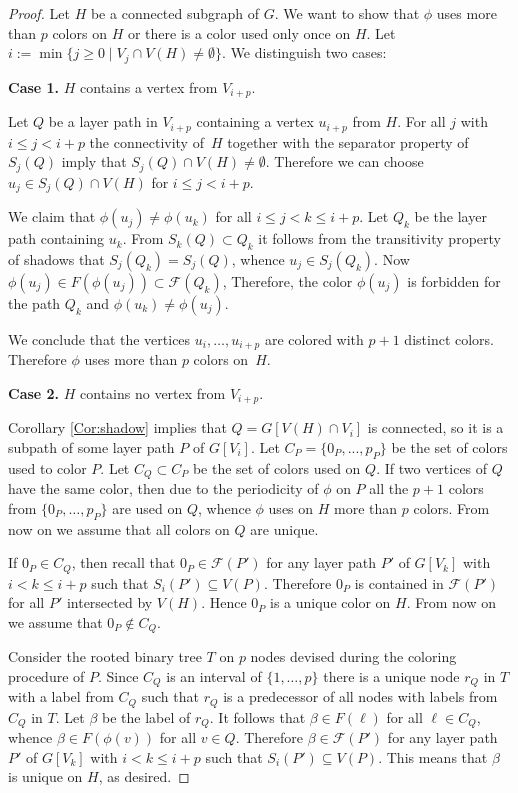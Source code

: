 \documentclass[11pt]{article}
\begin{document}
\begin{proof}
  Let $H$ be a connected subgraph of $G$. We want to show that $\phi$
  uses more than $p$ colors on $H$ or there is a color used only once
  on $H$. Let $i:=\min\{j\geq0\mid V_j\cap V(H)\neq \emptyset\}$.  We distinguish two
  cases: \medskip

\noindent\textbf{Case 1.}
$H$ contains a vertex from $V_{i+p}$.

Let $Q$ be a layer path in $V_{i+p}$ containing a vertex $u_{i+p}$
from $H$. For all $j$ with $i\leq j < i+p$ the connectivity of~$H$
together with the separator property of $S_j(Q)$ imply that
$S_j(Q) \cap V(H) \neq \emptyset$. Therefore we can choose
$u_j \in S_j(Q) \cap V(H)$ for $i\leq j < i+p$.

We claim that $\phi(u_j) \neq \phi(u_k)$ for all
$i\leq j < k \leq i+p$.  Let $Q_k$ be the layer path containing
$u_k$. From $S_k(Q) \subset Q_k$ it follows from the transitivity
property of shadows that $S_j(Q_k) = S_j(Q)$, whence $u_j \in S_j(Q_k)$. Now
$\phi(u_j) \in F(\phi(u_j)) \subset \mathcal{F}(Q_k)$,
Therefore, the color $\phi(u_j)$ is forbidden for the path $Q_k$ 
and $\phi(u_k)\neq\phi(u_j)$.
  
We conclude that the vertices $u_i,\ldots,u_{i+p}$ are colored with $p+1$ 
distinct colors. Therefore $\phi$ uses more than $p$ colors on~$H$.
\medskip
  
  \noindent\textbf{Case 2.}
  $H$ contains no vertex from $V_{i+p}$.
		
  Corollary \ref{Cor:shadow} implies that $Q=G[V(H)\cap V_i]$ is connected, so
  it is a subpath of some layer path $P$ of $G[V_i]$. Let $C_P=\{0_P,...,p_P\}$ be the set of colors
  used to color $P$.
  Let $C_Q\subset C_P$ be the set of colors used on $Q$.
  If two vertices of $Q$ have the same color, then due to the periodicity
  of $\phi$ on $P$ all the $p+1$ colors from $\{0_P,\ldots,p_P\}$ are used on $Q$, whence
  $\phi$ uses on $H$
  more than $p$ colors. From now on we assume that all colors on $Q$
  are unique.
  
  If $0_P \in C_Q$, then recall that $0_P \in \mathcal{F}(P')$ for any layer path
  $P'$ of $G[V_k]$ with $i<k\leq i+p$ such that $S_i(P') \subseteq V(P)$.
  Therefore $0_P$ is contained in $\mathcal{F}(P')$ for all $P'$ intersected
  by $V(H)$. Hence $0_P$ is a unique color on $H$. From now on we
  assume that $0_P \not\in C_Q$.
		
  Consider the rooted binary tree $T$ on $p$ nodes devised during the coloring procedure 
  of $P$. Since $C_Q$ is an interval of $\{1,\ldots,p\}$ 
  there is a unique node $r_Q$ in $T$ with a label from $C_Q$ such
  that $r_Q$ is a predecessor of all nodes with labels from $C_Q$ in $T$.
  Let $\beta$ be the label
  of $r_Q$. It follows that $\beta \in F(\ell)$ for all $\ell\in C_Q$, whence
  $\beta\in F(\phi(v))$ for all $v\in Q$.  Therefore $\beta \in \mathcal{F}(P')$
  for any layer path
  $P'$ of $G[V_k]$ with $i<k\leq i+p$ such that $S_i(P') \subseteq V(P)$.
  This means that $\beta$ is unique on $H$, as desired.
\end{proof}
\end{document}
